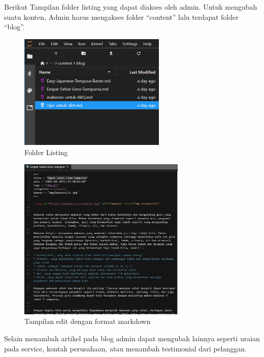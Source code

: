 Berikut Tampilan folder listing yang dapat diakses oleh admin. Untuk mengubah suatu konten, 
Admin harus mengakses folder “content” lalu terdapat folder “blog”.

\begin{figure}[htbp]
    \begin{center}
    \includegraphics[width=7cm]{img/scr-adm-2.png}
    \caption{Folder Listing}
    \label{gambar:scr-adm-2}
    \end{center}
\end{figure}


\begin{figure}[htbp]
    \begin{center}
    \includegraphics[width=8cm]{img/scr-adm-3.png}
    \caption{Tampilan edit dengan format markdown}
    \label{gambar:scr-adm-3}
    \end{center}
\end{figure}

Selain menambah artikel pada blog admin dapat mengubah lainnya seperti uraian pada service, 
kontak perusahaan, atau menambah testimonial dari pelanggan.

